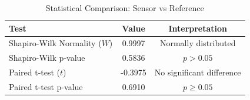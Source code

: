 
\begin{table}[h]
\centering
\caption{Statistical Comparison: Sensor vs Reference}
\label{tab:stats}
\begin{tabular}{lcc}
\hline
\textbf{Test} & \textbf{Value} & \textbf{Interpretation} \\
\hline
Shapiro-Wilk Normality ($W$) & 0.9997 & Normally distributed \\
Shapiro-Wilk p-value & 0.5836 & $p > 0.05$ \\
Paired t-test ($t$) & -0.3975 & No significant difference \\
Paired t-test p-value & 0.6910 & $p \geq 0.05$ \\
\hline
\end{tabular}
\end{table}
